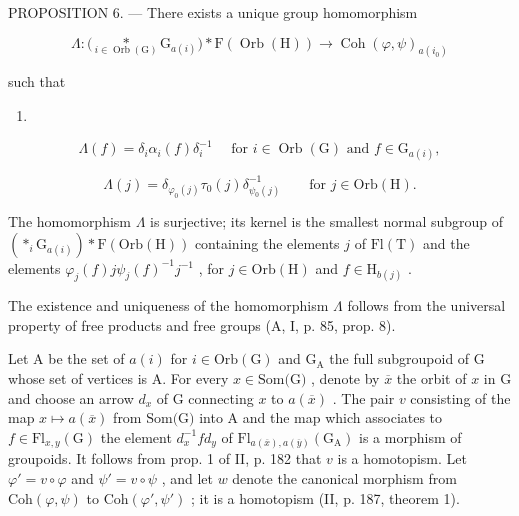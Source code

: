 PROPOSITION 6. --- There exists a unique group homomorphism

\[
\Lambda \colon \big (\underset {i \in \operatorname{Orb} (\mathrm{G})} {*} \mathrm{G} _ {a (i)} \big) * \mathrm{F} (\operatorname{Orb} (\mathrm{H})) \to \operatorname{Coh} (\varphi , \psi) _ {a (i _ {0})}
\]

such that

\begin{enumerate}
\def\labelenumi{(\arabic{enumi})}
\setcounter{enumi}{6}
\tightlist
\item
\end{enumerate}

\[
\Lambda (f) = \delta_ {i} \alpha_ {i} (f) \delta_ {i} ^ {- 1} \quad \text {   for   } i \in \operatorname{Orb} (\mathrm{G}) \text {   and   } f \in \mathrm{G} _ {a (i)},\tag{8}
\]

\[
\Lambda (j) = \delta_ {\varphi_ {0} (j)} \tau_ {0} (j) \delta_ {\psi_ {0} (j)} ^ {- 1} \qquad \text {for } j \in \mathrm{Orb} (\mathrm{H}).
\]

The homomorphism \(\Lambda\) is surjective; its kernel is the smallest normal subgroup of \((\ast_{i}\mathrm{G}_{a(i)})\ast\mathrm{F}(\mathrm{Orb}(\mathrm{H}))\) containing the elements \(j\) of \(\mathrm{Fl}(\mathrm{T})\) and the elements \(\varphi_{j}(f)j\psi_{j}(f)^{-1}j^{-1}\) , for \(j\in\mathrm{Orb}(\mathrm{H})\) and \(f\in\mathrm{H}_{b(j)}\) .

The existence and uniqueness of the homomorphism \(\Lambda\) follows from the universal property of free products and free groups (A, I, p. 85, prop. 8).

Let A be the set of \(a(i)\) for \(i \in \mathrm{Orb}(\mathrm{G})\) and \(\mathrm{G}_{\mathrm{A}}\) the full subgroupoid of G whose set of vertices is A. For every \(x \in \text{Som(G)}\) , denote by \(\overline{x}\) the orbit of \(x\) in G and choose an arrow \(d_x\) of G connecting \(x\) to \(a(\overline{x})\) . The pair \(v\) consisting of the map \(x \mapsto a(\overline{x})\) from \(\text{Som(G)}\) into A and the map which associates to \(f \in \text{Fl}_{x,y}(\text{G})\) the element \(d_x^{-1}fd_y\) of \(\text{Fl}_{a(\overline{x}),a(\overline{y})}(\text{G}_\text{A})\) is a morphism of groupoids. It follows from prop. 1 of II, p. 182 that \(v\) is a homotopism. Let \(\varphi' = v \circ \varphi\) and \(\psi' = v \circ \psi\) , and let \(w\) denote the canonical morphism from \(\text{Coh}(\varphi, \psi)\) to \(\text{Coh}(\varphi', \psi')\) ; it is a homotopism (II, p. 187, theorem 1).

